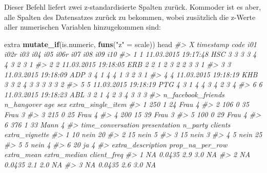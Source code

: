 \documentclass[12pt,ngerman,]{book}
\makeatletter
\newenvironment{Shaded}{\begin{snugshade}}{\end{snugshade}}
\newcommand{\KeywordTok}[1]{\textcolor[rgb]{0.13,0.29,0.53}{\textbf{{#1}}}}
\newcommand{\StringTok}[1]{\textcolor[rgb]{0.31,0.60,0.02}{{#1}}}
\newcommand{\CommentTok}[1]{\textcolor[rgb]{0.56,0.35,0.01}{\textit{{#1}}}}
\newcommand{\NormalTok}[1]{{#1}}
\newenvironment{kframe}{%
\medskip{}
\setlength{\fboxsep}{.8em}
 \def\at@end@of@kframe{}%
 \ifinner\ifhmode%
  \def\at@end@of@kframe{\end{minipage}}%
  \begin{minipage}{\columnwidth}%
 \fi\fi%
 \def\FrameCommand##1{\hskip\@totalleftmargin \hskip-\fboxsep
 \colorbox{shadecolor}{##1}\hskip-\fboxsep
     \hskip-\linewidth \hskip-\@totalleftmargin \hskip\columnwidth}%
 \MakeFramed {\advance\hsize-\width
   \@totalleftmargin\z@ \linewidth\hsize
   \@setminipage}}%
 {\par\unskip\endMakeFramed%
 \at@end@of@kframe}
\renewenvironment{Shaded}{\begin{kframe}}{\end{kframe}}
\makeatother
\begin{document}
Dieser Befehl liefert zwei z-standardisierte Spalten zurück. Kommoder
ist es aber, alle Spalten des Datensatzes zurück zu bekommen, wobei
zusätzlich die z-Werte aller numerischen Variablen hinzugekommen sind:

\begin{Shaded}
\begin{Highlighting}[]
\NormalTok{extra %
\StringTok{  }\KeywordTok{mutate_if}\NormalTok{(is.numeric, }\KeywordTok{funs}\NormalTok{(}\StringTok{"z"} \NormalTok{=}\StringTok{ }\NormalTok{scale)) %
\StringTok{  }\NormalTok{head}
\CommentTok{#>   X           timestamp code i01 i02r i03 i04 i05 i06r i07 i08 i09 i10}
\CommentTok{#> 1 1 11.03.2015 19:17:48  HSC   3    3   3   3   4    4   3   2   3   1}
\CommentTok{#> 2 2 11.03.2015 19:18:05  ERB   2    2   1   2   3    2   2   3   3   1}
\CommentTok{#> 3 3 11.03.2015 19:18:09  ADP   3    4   1   4   4    1   3   2   3   1}
\CommentTok{#> 4 4 11.03.2015 19:18:19  KHB   3    3   2   4   3    3   3   3   3   2}
\CommentTok{#> 5 5 11.03.2015 19:18:19  PTG   4    3   1   4   4    3   4   2   3   4}
\CommentTok{#> 6 6 11.03.2015 19:18:23  ABL   3    2   1   4   2    3   4   3   3   3}
\CommentTok{#>   n_facebook_friends n_hangover age  sex extra_single_item}
\CommentTok{#> 1                250          1  24 Frau                 4}
\CommentTok{#> 2                106          0  35 Frau                 3}
\CommentTok{#> 3                215          0  25 Frau                 4}
\CommentTok{#> 4                200         15  39 Frau                 3}
\CommentTok{#> 5                100          0  29 Frau                 4}
\CommentTok{#> 6                376          1  33 Mann                 4}
\CommentTok{#>   time_conversation presentation n_party clients extra_vignette}
\CommentTok{#> 1                10         nein      20                       }
\CommentTok{#> 2                15         nein       5                       }
\CommentTok{#> 3                15         nein       3                       }
\CommentTok{#> 4                 5         nein      25                       }
\CommentTok{#> 5                 5         nein       4                       }
\CommentTok{#> 6                20           ja       4                       }
\CommentTok{#>   extra_description prop_na_per_row extra_mean extra_median client_freq}
\CommentTok{#> 1                NA          0.0435        2.9          3.0          NA}
\CommentTok{#> 2                NA          0.0435        2.1          2.0          NA}
\CommentTok{#> 3                NA          0.0435        2.6          3.0          NA}
}}
\end{Highlighting}
\end{Shaded}
\end{document}
